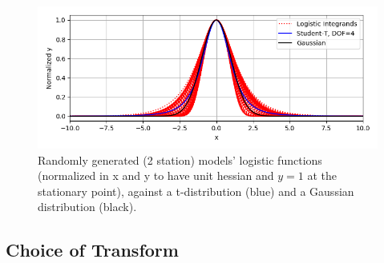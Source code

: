 \begin{figure}[!htb]
\begin{center}
\includegraphics[width=1.\textwidth]{Chap6_EvaluationAndAnalysis/distribution_variation/dist_and_models.png}
\caption{ Randomly generated (2 station) models' logistic functions (normalized in x and y to have unit hessian and \(y=1\) at the stationary point), against a t-distribution (blue) and a Gaussian distribution (black).}
\label{fig:distributiondistribution}
\end{center}
\end{figure}

\subsection{Choice of Transform}

